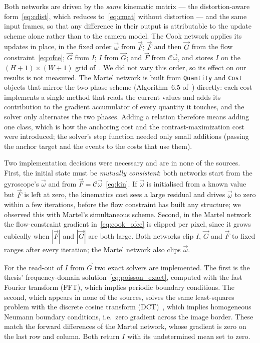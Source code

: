 \documentclass[journal]{IEEEtran}
\newcommand{\Imap}{I}
\newcommand{\Gmap}{\vec{G}}
\newcommand{\Fmap}{\vec{F}}
\newcommand{\Cmat}{\mathcal{C}}
\newcommand{\wvec}{\vec{\omega}}
\begin{document}
Both networks are driven by the \emph{same} kinematic matrix --- the
distortion-aware form~\eqref{eq:cdist}, which reduces to~\eqref{eq:cmat}
without distortion --- and the same input frames, so that any difference in
their output is attributable to the update scheme alone rather than to the
camera model. The Cook network applies its updates in place, in the fixed order
$\wvec$ from $\Fmap$; $\Fmap$ and then $\Gmap$ from the flow
constraint~\eqref{eq:ofce}; $\Gmap$ from $\Imap$; $\Imap$ from $\Gmap$; and
$\Fmap$ from $\Cmat\wvec$, and stores $\Imap$ on the
$(H\!+\!1)\times(W\!+\!1)$ grid of~\cite{cook2011}. We did not vary this order, so its effect on our results is not measured. The Martel network is built
from \texttt{Quantity} and \texttt{Cost} objects that mirror
the two-phase scheme (Algorithm~6.5 of~\cite{martel2019thesis}) directly: each cost implements a single method that reads the
current values and adds its contribution to the gradient accumulator of every
quantity it touches, and the solver only alternates the two phases. Adding a
relation therefore means adding one class, which is how the anchoring cost and
the contrast-maximization cost were introduced; the solver's step function
needed only small additions (passing the anchor target and the events to the
costs that use them).

Two implementation decisions were necessary and are in none of the sources.
First, the initial state must be \emph{mutually consistent}: both networks start
from the gyroscope's $\wvec$ and from $\Fmap = \Cmat\wvec$~\eqref{eq:kin}. If $\wvec$ is initialised from a known value but $\Fmap$ is left at zero, the kinematics cost sees a large residual and drives $\wvec$ to zero within a few
iterations, before the flow constraint has built any structure; we observed this with Martel's simultaneous scheme. Second, in the Martel network
the flow-constraint gradient in~\eqref{eq:cook_ofce} is clipped per pixel, since
it grows cubically when $|\Fmap|$ and $|\Gmap|$ are both large. Both networks
clip $\Imap$, $\Gmap$ and $\Fmap$ to fixed ranges after every iteration; the
Martel network also clips $\wvec$. 

For the read-out of $\Imap$ from $\Gmap$ two exact solvers are implemented. The
first is the thesis' frequency-domain solution~\eqref{eq:poisson_exact},
computed with the fast Fourier transform (FFT), which implies periodic boundary
conditions. The second, which appears in none of the sources, solves the same
least-squares problem with the discrete cosine transform
(DCT)~\cite{simchony1990}, which implies homogeneous Neumann boundary
conditions, i.e.\ zero gradient across the image border. These match the
forward differences of the Martel network, whose gradient is zero on the last
row and column. Both return $\Imap$ with its undetermined mean set to zero.
\end{document}
